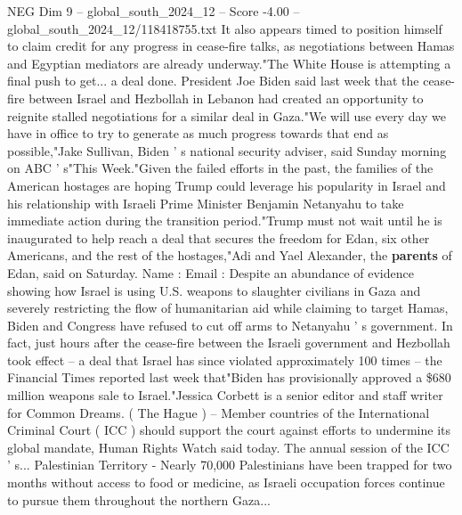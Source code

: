 \begin{textsample}{NEG Dim 9 – global\_south\_2024\_12 – Score -4.00 – global\_south\_2024\_12/118418755.txt}
It also appears timed to position himself to claim credit for any progress in cease-fire talks, as negotiations between Hamas and Egyptian mediators are already underway."The White House is attempting a final push to get... a deal done.
President Joe Biden said last week that the cease-fire between Israel and Hezbollah in Lebanon had created an opportunity to reignite stalled negotiations for a similar deal in Gaza."We will use every day we have in office to try to generate as much progress towards that end as possible,"Jake Sullivan, Biden ' s national security adviser, said Sunday morning on ABC ' s"This Week."Given the failed efforts in the past, the families of the American hostages are hoping Trump could leverage his popularity in Israel and his relationship with Israeli Prime Minister Benjamin Netanyahu to take immediate action during the transition period."Trump must not wait until he is inaugurated to help reach a deal that secures the freedom for Edan, six other Americans, and the rest of the hostages,"Adi and Yael Alexander, the \textbf{parents} of Edan, said on Saturday.
Name : Email : Despite an abundance of evidence showing how Israel is using U.S. weapons to slaughter civilians in Gaza and severely restricting the flow of humanitarian aid while claiming to target Hamas, Biden and Congress have refused to cut off arms to Netanyahu ' s government.
In fact, just hours after the cease-fire between the Israeli government and Hezbollah took effect -- a deal that Israel has since violated approximately 100 times -- the Financial Times reported last week that"Biden has provisionally approved a \$680 million weapons sale to Israel."Jessica Corbett is a senior editor and staff writer for Common Dreams. ( The Hague ) -- Member countries of the International Criminal Court ( ICC ) should support the court against efforts to undermine its global mandate, Human Rights Watch said today.
The annual session of the ICC ' s...
Palestinian Territory - Nearly 70,000 Palestinians have been trapped for two months without access to food or medicine, as Israeli occupation forces continue to pursue them throughout the northern Gaza...

\end{textsample}
